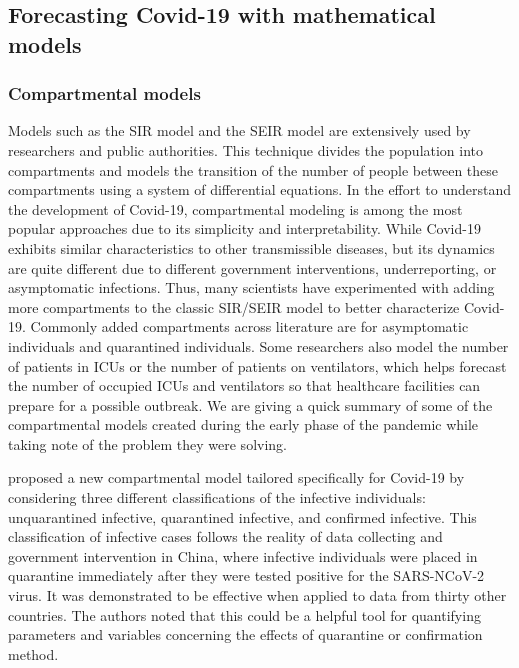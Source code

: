 \subsection{Forecasting Covid-19 with mathematical models}

\subsubsection{Compartmental models}

Models such as the \gls{SIR} model and the \gls{SEIR} model \cite{kermackContributionMathematicalTheory1927, kermackContributionsMathematicalTheory1932, kermackContributionsMathematicalTheory1933, brauerCompartmentalModelsEpidemiology2008} are extensively used by researchers and public authorities.
This technique divides the population into compartments and models the transition of the number of people between these compartments using a system of differential equations.
In the effort to understand the development of Covid-19, compartmental modeling is among the most popular approaches due to its simplicity and interpretability.
While Covid-19 exhibits similar characteristics to other transmissible diseases, but its dynamics are quite different due to different government interventions, underreporting, or asymptomatic infections.
Thus, many scientists have experimented with adding more compartments to the classic \gls{SIR}/\gls{SEIR} model to better characterize Covid-19.
Commonly added compartments across literature are for asymptomatic individuals and quarantined individuals.
Some researchers also model the number of patients in \glspl{ICU} or the number of patients on ventilators, which helps forecast the number of occupied \glspl{ICU} and ventilators so that healthcare facilities can prepare for a possible outbreak.
We are giving a quick summary of some of the compartmental models created during the early phase of the pandemic while taking note of the problem they were solving.

\citeauthor{zhaoModelingEpidemicDynamics2020} \cite{zhaoModelingEpidemicDynamics2020} proposed a new compartmental model tailored specifically for Covid-19 by considering three different classifications of the infective individuals: unquarantined infective, quarantined infective, and confirmed infective.
This classification of infective cases follows the reality of data collecting and government intervention in China, where infective individuals were placed in quarantine immediately after they were tested positive for the SARS-NCoV-2 virus.
It was demonstrated to be effective when applied to data from thirty other countries.
The authors noted that this could be a helpful tool for quantifying parameters and variables concerning the effects of quarantine or confirmation method.

